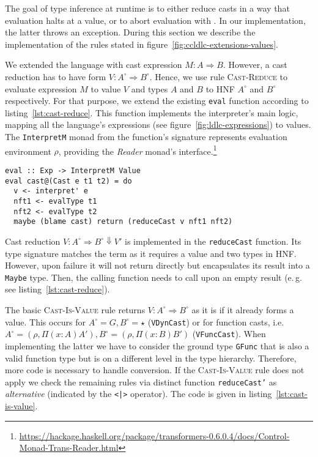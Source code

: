 The goal of type inference at runtime is to either reduce casts in a way that evaluation halts at a value, or to abort evaluation with \blame. In our implementation, the latter throws an exception. During this section we describe the implementation of the rules stated in figure~\ref{fig:ccldlc-extensions-values}.

We extended the language with cast expression $M : A \Rightarrow B$. However, a cast reduction has to have form $V : A^\circ \Rightarrow B^\circ$. Hence, we use rule \textsc{Cast-Reduce} to evaluate expression $M$ to value $V$ and types $A$ and $B$ to HNF $A^\circ$ and $B^\circ$ respectively. For that purpose, we extend the existing \texttt{eval} function according to listing~\ref{lst:cast-reduce}. This function implements the interpreter's main logic, mapping all the language's expressions (see figure~\ref{fig:ldlc-expressions}) to values. The \texttt{InterpretM} monad from the function's signature represents evaluation environment $\rho$, providing the \emph{Reader} monad's interface.\footnote{\url{https://hackage.haskell.org/package/transformers-0.6.0.4/docs/Control-Monad-Trans-Reader.html}}

\begin{lstlisting}[float,
  caption=Haskell: Cast expression evaluation (\texttt{Interpreter.hs}),
  label=lst:cast-reduce]
eval :: Exp -> InterpretM Value
eval cast@(Cast e t1 t2) = do
  v <- interpret' e
  nft1 <- evalType t1
  nft2 <- evalType t2
  maybe (blame cast) return (reduceCast v nft1 nft2)
\end{lstlisting}

Cast reduction $V : A^\circ \Rightarrow B^\circ \Downarrow V'$ is implemented in the \texttt{reduceCast} function. Its type signature matches the term as it requires a value and two types in HNF. However, upon failure it will not return \blame directly but encapsulates its result into a \texttt{Maybe} type. Then, the calling function needs to call \blame upon an empty result (e.\,g. see listing~\ref{lst:cast-reduce}).

The basic \textsc{Cast-Is-Value} rule returns $V : A^\circ \Rightarrow B^\circ$ as it is if it already forms a value. This occurs for $A^\circ = G, B^\circ = \star$ (\texttt{VDynCast}) or for function casts, i.e. $A^\circ=(\rho, \Pi(x:A)A'), B^\circ=(\rho, \Pi(x:B)B')$ (\texttt{VFuncCast}). When implementing the latter we have to consider the ground type \texttt{GFunc} that is also a valid function type but is on a different level in the type hierarchy. Therefore, more code is necessary to handle conversion. If the \textsc{Cast-Is-Value} rule does not apply we check the remaining rules via distinct function \texttt{reduceCast'} as \emph{alternative} (indicated by the \texttt{<|>} operator). The code is given in listing~\ref{lst:cast-is-value}.

